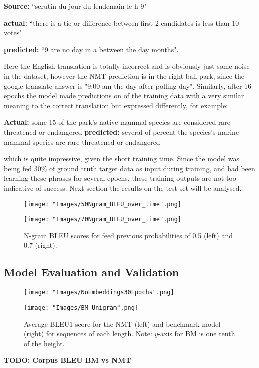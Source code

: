 \documentclass[]{article}
\begin{document}
\begin{center}
	\textbf{Source:} ``scrutin du jour du lendemain le h 9" 
	
	\textbf{actual:} ``there is a tie or difference between first 2 candidates is less than 10 votes" 
	
	\textbf{predicted:}  ``9 are no day in a between the day months".

\end{center}
Here the English translation is totally incorrect and is obviously just some noise in the dataset, however the NMT prediction is in the right ball-park, since the google translate answer is "9:00 am the day after polling day". Similarly, after 16 epochs the model made predictions on of the training data with a very similar meaning to the correct translation but expressed differently, for example:
\begin{center}
\textbf{Actual:} some 15 of the park's native mammal species are considered rare threatened or endangered 
\textbf{predicted:} several of percent the species's marine mammal species are rare threatened or endangered
\end{center}
which is quite impressive, given the short training time. Since the model was being fed 30\% of ground truth target data as input during training, and had been learning these phrases for several epochs, these training outputs are not too indicative of success. Next section the results on the test set will be analysed.
\begin{figure}[h]
	\centering
	\begin{minipage}[b]{0.48\textwidth}
		\texttt{[image: "Images/50Ngram\_BLEU\_over\_time".png]}
	\end{minipage}
	\begin{minipage}[b]{0.48\textwidth}
		\texttt{[image: "Images/70Ngram\_BLEU\_over\_time".png]}
	\end{minipage}
	\caption{N-gram BLEU scores for feed previous probabilities of 0.5 (left) and 0.7 (right). }
	\label{fig:over_time}
\end{figure}

\subsection{Model Evaluation and Validation}

\begin{figure}[h]
	\centering
	\begin{minipage}[b]{0.48\textwidth}
		\texttt{[image: "Images/NoEmbeddings30Epochs".png]}
	\end{minipage}
	\begin{minipage}[b]{0.48\textwidth}
		\texttt{[image: "Images/BM\_Unigram".png]}
	\end{minipage}
	\caption{Average BLEU1 score for the NMT (left) and benchmark model (right) for sequences of each length. Note: $y$-axis for BM is one tenth of the height.}
	\label{fig:per_sequence}
\end{figure}
\textbf{TODO: Corpus BLEU BM vs NMT}
\end{document}
